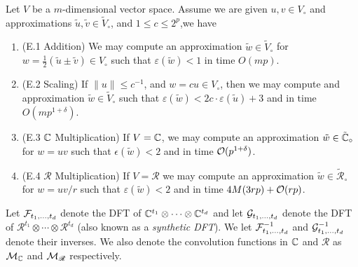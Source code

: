 \medskip

\begin{proposition}
    Let $V$ be a $m$-dimensional vector space. Assume we are given $u, v \in V_\circ$ and approximations $\tilde{u}, \tilde{v} \in \tilde{V}_\circ$, and $1 \le c \le 2^p$,we have
    \begin{enumerate}
        \item (E.1 Addition) We may compute an approximation $\tilde{w} \in \tilde{V}_\circ$ for $w = \tfrac{1}{2}(\tilde{u} \pm \tilde{v}) \in V_\circ$ such that $\varepsilon(\tilde{w}) < 1$ in time $O(mp)$.
        \item (E.2 Scaling) If $\|u\| \le c^{-1}$, and $w = cu \in V_\circ$, then we may compute and approximation $\tilde{w} \in \tilde{V}_\circ$ such that $\varepsilon(\tilde{w}) < 2c \cdot \varepsilon(\tilde{u}) + 3$ and in time $O(mp^{1 + \delta})$.
        \item (E.3 ${\mathbb C}$ Multiplication) If $V = {\mathbb C}$, we may compute an approximation $\tilde{w} \in \tilde{{\mathbb C}}_\circ$ for $w = uv$ such that $\epsilon(\tilde{w}) < 2$ and in time $\mathcal O(p^{1 + \delta})$.
        \item (E.4 $\mathscr{R}$ Multiplication) If $V = \mathscr{R}$ we may compute an approximation $\tilde{w} \in \tilde{\mathscr{R}}_\circ$ for $w = uv/r$ such that $\varepsilon(\tilde{w}) < 2$ and in time $4M(3rp) + \mathcal O(rp)$.
    \end{enumerate}
\end{proposition}

Let $\mathcal F_{t_1, \ldots, t_d}$ denote the DFT of ${\mathbb C}^{t_1} \otimes \cdots \otimes {\mathbb C}^{t_d}$ and let $\mathcal G_{t_1, \ldots, t_d}$ denote the DFT of $\mathscr{R}^{t_1} \otimes \cdots \otimes \mathscr{R}^{t_d}$ (also known as a \emph{synthetic DFT}).
We let $\mathcal F^{-1}_{t_1, \ldots, t_d}$ and $\mathcal G_{t_1, \ldots, t_d}^{-1}$ denote their inverses.
We also denote the convolution functions in ${\mathbb C}$ and $\mathscr{R}$ as $\mathcal M_{\mathbb C}$ and $\mathcal M_\mathscr{R}$ respectively.

